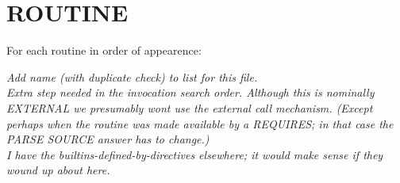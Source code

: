 \section{ROUTINE}\label{routine}

For each routine in order of appearence:

\emph{Add name (with duplicate check) to list for this file.\\
Extra step needed in the invocation search order. Although this is
nominally EXTERNAL we presumably wont use the external call mechanism.
(Except perhaps when the routine was made available by a REQUIRES; in
that case the PARSE SOURCE answer has to change.)\\
I have the builtins-defined-by-directives elsewhere; it would make sense
if they wound up about here.}
